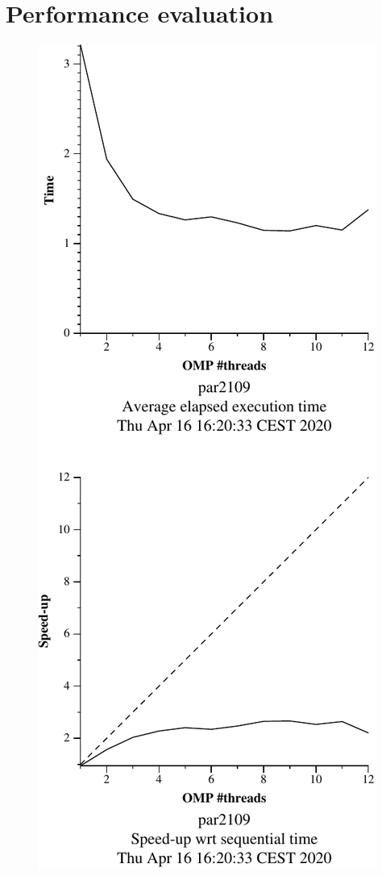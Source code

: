 \pagebreak

\section{Performance evaluation}%
\label{sec:Performance evaluation}



\begin{figure}[H]
    \begin{minipage}{0.5\textwidth}
        \centering
        \includegraphics[width=0.7\linewidth]{plots/v1-crop.pdf}

\end{minipage}
\end{figure}

